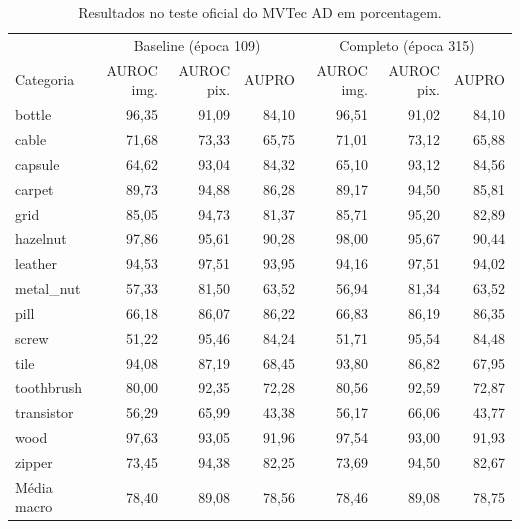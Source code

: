 \begin{table}[htbp]
\centering
\caption{Resultados no teste oficial do MVTec AD em porcentagem.}
\label{tab:mvtec-final}
\setlength{\tabcolsep}{4pt}
\begin{tabular}{lrrrrrr}
\hline
 & \multicolumn{3}{c}{Baseline (época 109)} & \multicolumn{3}{c}{Completo (época 315)} \\
Categoria & AUROC img. & AUROC pix. & AUPRO & AUROC img. & AUROC pix. & AUPRO \\
\hline
bottle & 96,35 & 91,09 & 84,10 & 96,51 & 91,02 & 84,10 \\
cable & 71,68 & 73,33 & 65,75 & 71,01 & 73,12 & 65,88 \\
capsule & 64,62 & 93,04 & 84,32 & 65,10 & 93,12 & 84,56 \\
carpet & 89,73 & 94,88 & 86,28 & 89,17 & 94,50 & 85,81 \\
grid & 85,05 & 94,73 & 81,37 & 85,71 & 95,20 & 82,89 \\
hazelnut & 97,86 & 95,61 & 90,28 & 98,00 & 95,67 & 90,44 \\
leather & 94,53 & 97,51 & 93,95 & 94,16 & 97,51 & 94,02 \\
metal\_nut & 57,33 & 81,50 & 63,52 & 56,94 & 81,34 & 63,52 \\
pill & 66,18 & 86,07 & 86,22 & 66,83 & 86,19 & 86,35 \\
screw & 51,22 & 95,46 & 84,24 & 51,71 & 95,54 & 84,48 \\
tile & 94,08 & 87,19 & 68,45 & 93,80 & 86,82 & 67,95 \\
toothbrush & 80,00 & 92,35 & 72,28 & 80,56 & 92,59 & 72,87 \\
transistor & 56,29 & 65,99 & 43,38 & 56,17 & 66,06 & 43,77 \\
wood & 97,63 & 93,05 & 91,96 & 97,54 & 93,00 & 91,93 \\
zipper & 73,45 & 94,38 & 82,25 & 73,69 & 94,50 & 82,67 \\
\hline
Média macro & 78,40 & 89,08 & 78,56 & 78,46 & 89,08 & 78,75 \\
\hline
\end{tabular}
\end{table}
